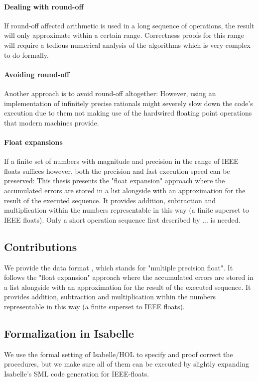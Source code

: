 \documentclass[11pt,a4paper]{article}
\begin{document}
\paragraph{Dealing with round-off}
If round-off affected arithmetic is used in a long sequence of operations, the result will only approximate within a certain range. Correctness proofs for this range will require a tedious numerical analysis of the algorithms which is very complex to do formally.

\paragraph{Avoiding round-off}
Another approach is to avoid round-off altogether: However, using an implementation of infinitely precise rationals might severely slow down the code's execution due to them not making use of the hardwired floating point operations that modern machines provide.

\paragraph{Float expansions}
If a finite set of numbers with magnitude and precision in the range of IEEE floats suffices however, both the precision and fast execution speed can be preserved: This thesis presents the "float expansion" approach where the accumulated errors are stored in a list alongside with an approximation for the result of the executed sequence. It provides addition, subtraction and multiplication within the numbers representable in this way (a finite superset to IEEE floats).
Only a short operation sequence first described by ... is needed.

\subsection{Contributions}
We provide the data format \typmpf
, which stands for "multiple precision float". It follows the "float expansion" approach where the accumulated errors are stored in a list alongside with an approximation for the result of the executed sequence. It provides addition, subtraction and multiplication within the numbers representable in this way (a finite superset to IEEE floats).

\subsection{Formalization in Isabelle}
We use the formal setting of Isabelle/HOL to specify and proof correct the procedures, but we make sure all of them can be executed by slightly expanding Isabelle's SML code generation for IEEE-floats.
\end{document}
